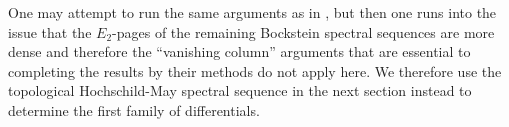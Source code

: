 
\begin{rmk}
One may attempt to run the same arguments as in \cite{AHL}, but then one runs into the issue that the $E_2$-pages of the remaining Bockstein spectral sequences are more dense and therefore the ``vanishing column'' arguments that are essential to completing the results by their methods do not apply here. We therefore use the topological Hochschild-May spectral sequence in the next section instead to determine the first family of differentials. 
\end{rmk}












 